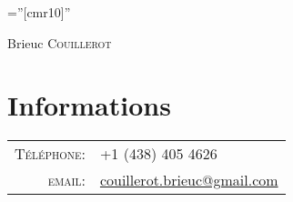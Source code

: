 \documentclass[a4paper,10pt]{article}
\begin{document}

\pagestyle{empty} %

\font\fb=''[cmr10]'' %

\par{\centering
		{\Huge Brieuc \textsc{Couillerot}
	}\bigskip\par}

\section{Informations}

\begin{tabular}{rl}
    \textsc{Téléphone:}     & +1 (438) 405 4626\\
    \textsc{email:}     & \href{mailto:couillerot.brieuc@gmail.com}{couillerot.brieuc@gmail.com}
\end{tabular}


\end{document}
